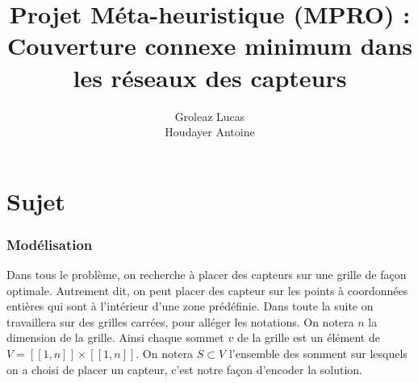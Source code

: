 \documentclass[12pt,a4paper]{article}
\title{Projet Méta-heuristique (MPRO) : Couverture connexe minimum dans les réseaux des capteurs}
\author{Groleaz Lucas \\ Houdayer Antoine}
\begin{document}
\maketitle
\tableofcontents
\part{Sujet}
\section{Modélisation}
Dans tous le problème, on recherche à placer des capteurs sur une grille de façon optimale. Autrement dit, on peut placer des capteur sur les points à coordonnées entières qui sont à l'intérieur d'une zone prédéfinie. Dans toute la suite on travaillera sur des grilles carrées, pour alléger les notations. On notera $n$ la dimension de la grille. Ainsi chaque sommet $v$ de la grille est un élément de $V=[\![1,n]\!]\times [\![1,n]\!]$. On notera $S\subset V$ l'ensemble des somment sur lesquels on a choisi de placer un capteur, c'est notre façon d'encoder la solution.
\end{document}

